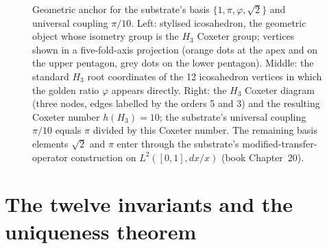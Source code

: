 \documentclass[11pt,a4paper]{amsart}
\theoremstyle{plain}
\theoremstyle{definition}
\begin{document}
\begin{figure}[h]
\caption{Geometric anchor for the substrate's basis $\{1,\pi,\varphi,\sqrt{2}\}$ and universal coupling $\pi/10$. Left: stylised icosahedron, the geometric object whose isometry group is the $H_3$ Coxeter group; vertices shown in a five-fold-axis projection (orange dots at the apex and on the upper pentagon, grey dots on the lower pentagon). Middle: the standard $H_3$ root coordinates of the 12 icosahedron vertices in which the golden ratio $\varphi$ appears directly. Right: the $H_3$ Coxeter diagram (three nodes, edges labelled by the orders 5 and 3) and the resulting Coxeter number $h(H_3) = 10$; the substrate's universal coupling $\pi/10$ equals $\pi$ divided by this Coxeter number. The remaining basis elements $\sqrt{2}$ and $\pi$ enter through the substrate's modified-transfer-operator construction on $L^2([0,1], dx/x)$ (book Chapter~20).}
\label{fig:h3anchor}
\end{figure}

\section{The twelve invariants and the uniqueness theorem}\label{sec:invariants}
\end{document}
